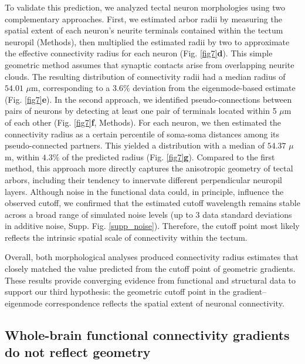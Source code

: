 \documentclass{article}
\begin{document}
To validate this prediction, we analyzed tectal neuron morphologies using two complementary approaches. First, we estimated arbor radii by measuring the spatial extent of each neuron's neurite terminals contained within the tectum neuropil (Methods), then multiplied the estimated radii by two to approximate the effective connectivity radius for each neuron (Fig. \ref{fig7}\textbf{d}). This simple geometric method assumes that synaptic contacts arise from overlapping neurite clouds. The resulting distribution of connectivity radii had a median radius of $54.01$ $\mu$m, corresponding to a $3.6\%$ deviation from the eigenmode-based estimate (Fig. \ref{fig7}\textbf{e}). In the second approach, we identified pseudo-connections between pairs of neurons by detecting at least one pair of terminals located within 5 $\mu$m of each other (Fig. \ref{fig7}\textbf{f}, Methods). For each neuron, we then estimated the connectivity radius as a certain percentile of soma-soma distances among its pseudo-connected partners. This yielded a distribution with a median of $54.37$ $\mu$m, within $4.3\%$ of the predicted radius (Fig. \ref{fig7}\textbf{g}). Compared to the first method, this approach more directly captures the anisotropic geometry of tectal arbors, including their tendency to innervate different perpendicular neuropil layers. Although noise in the functional data could, in principle, influence the observed cutoff, we confirmed that the estimated cutoff wavelength remains stable across a broad range of simulated noise levels (up to 3 data standard deviations in additive noise, Supp. Fig. \ref{supp_noise}). Therefore, the cutoff point most likely reflects the intrinsic spatial scale of connectivity within the tectum.

Overall, both morphological analyses produced connectivity radius estimates that closely matched the value predicted from the cutoff point of geometric gradients. These results provide converging evidence from functional and structural data to support our third hypothesis: the geometric cutoff point in the gradient–eigenmode correspondence reflects the spatial extent of neuronal connectivity.

\subsection*{Whole-brain functional connectivity gradients do not reflect geometry}
\end{document}
